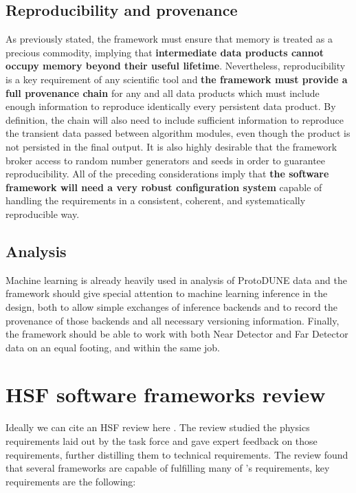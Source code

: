 \documentclass[../main-v1.tex]{subfiles}
\begin{document}
\subsection{Reproducibility and provenance}
As previously stated, the framework must ensure that memory is treated as a precious commodity, implying that {\bf intermediate data products cannot occupy memory beyond their useful lifetime}.  Nevertheless, reproducibility is a key requirement of any scientific tool and {\bf the framework must provide a full provenance chain} for any and all data products which must include enough information to reproduce identically every persistent data product. By definition, the chain will also need to include sufficient information to reproduce the transient data passed between algorithm modules, even though the product is not persisted in the final output.
It is also highly desirable that the framework broker access to random number generators and seeds in order to guarantee reproducibility.  All of the preceding considerations imply that {\bf the software framework will need a very robust configuration system} capable of handling the requirements in a consistent, coherent, and systematically reproducible way.

\subsection{Analysis}
Machine learning is already heavily used in analysis of ProtoDUNE data and the framework should give special attention to machine learning inference in the design, both to allow simple exchanges of inference backends and to record the provenance of those backends and all necessary versioning information.  Finally, the framework should be able to work with both Near Detector and Far Detector data on an equal footing, and within the same job.


\section{HSF software frameworks review }

Ideally we can cite an HSF review here \cite{HSF-fwk-review}.  The review studied the physics requirements laid out by the task force and gave expert feedback on those requirements, further distilling them to technical requirements.  The review found that several frameworks are capable of fulfilling many of 's requirements, key requirements are the following:
\end{document}
